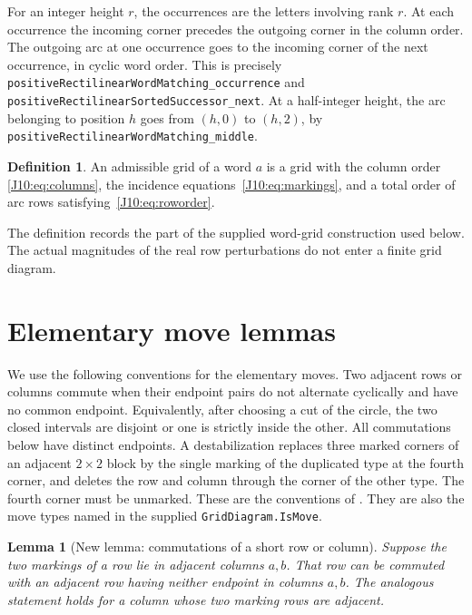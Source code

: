 \documentclass[11pt,oneside]{report}
\newtheorem{lemma}[theorem]{Lemma}
\theoremstyle{definition}
\newtheorem{definition}[theorem]{Definition}
\numberwithin{equation}{section}
\newcommand{\decl}[1]{\textnormal{\nolinkurl{#1}}}
\begin{document}
For an integer height $r$, the occurrences are the letters involving
rank $r$. At each occurrence the incoming corner precedes the outgoing
corner in the column order. The outgoing arc at one occurrence goes
to the incoming corner of the next occurrence, in cyclic word order.
This is precisely
\decl{positiveRectilinearWordMatching_occurrence} and
\decl{positiveRectilinearSortedSuccessor_next}.
At a half-integer height, the arc belonging to position $h$ goes from
$(h,0)$ to $(h,2)$, by
\decl{positiveRectilinearWordMatching_middle}.

\begin{definition}
An admissible grid of a word $a$ is a grid with the column order
\eqref{J10:eq:columns}, the incidence equations~\eqref{J10:eq:markings}, and
a total order of arc rows satisfying~\eqref{J10:eq:roworder}.
\end{definition}

The definition records the part of the supplied word-grid construction
used below. The actual magnitudes of the real row perturbations do not
enter a finite grid diagram.

\section{Elementary move lemmas}

We use the following conventions for the elementary moves. Two adjacent
rows or columns commute when their endpoint pairs do not alternate
cyclically and have no common endpoint. Equivalently, after choosing
a cut of the circle, the two closed intervals are disjoint or one is
strictly inside the other. All commutations below have distinct
endpoints. A destabilization replaces three marked corners of an
adjacent $2\times2$ block by the single marking of the duplicated type
at the fourth corner, and deletes the row and column through the
corner of the other type. The fourth corner must be unmarked.
These are the conventions of
\cite[Definitions~3.1.6 and 3.1.7, Section~3.2]{OSSbook}.
They are also the move types
named in the supplied \decl{GridDiagram.IsMove}.

\begin{lemma}[New lemma: commutations of a short row or column]
\label{J10:lem:short}
Suppose the two markings of a row lie in adjacent columns $a,b$.
That row can be commuted with an adjacent row having neither endpoint
in columns $a,b$. The analogous statement holds for a column whose
two marking rows are adjacent.
\end{lemma}
\end{document}
